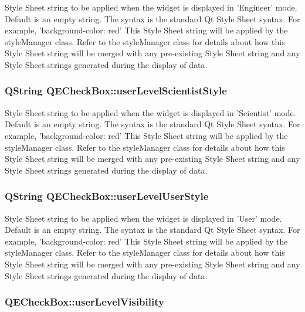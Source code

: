 \label{classQECheckBox_ae4c0cf42959e19b91ae4894a10c22012}
Style Sheet string to be applied when the widget is displayed in 'Engineer' mode. Default is an empty string. The syntax is the standard Qt Style Sheet syntax. For example, 'background-\/color: red' This Style Sheet string will be applied by the styleManager class. Refer to the styleManager class for details about how this Style Sheet string will be merged with any pre-\/existing Style Sheet string and any Style Sheet strings generated during the display of data. \hypertarget{classQECheckBox_ad57869fb4989034ec09ef1a57ab87bb0}{
\subsubsection[{userLevelScientistStyle}]{\setlength{\rightskip}{0pt plus 5cm}QString QECheckBox::userLevelScientistStyle}}
\label{classQECheckBox_ad57869fb4989034ec09ef1a57ab87bb0}
Style Sheet string to be applied when the widget is displayed in 'Scientist' mode. Default is an empty string. The syntax is the standard Qt Style Sheet syntax. For example, 'background-\/color: red' This Style Sheet string will be applied by the styleManager class. Refer to the styleManager class for details about how this Style Sheet string will be merged with any pre-\/existing Style Sheet string and any Style Sheet strings generated during the display of data. \hypertarget{classQECheckBox_a6e46e41202d593976b629f33b43892b5}{
\subsubsection[{userLevelUserStyle}]{\setlength{\rightskip}{0pt plus 5cm}QString QECheckBox::userLevelUserStyle}}
\label{classQECheckBox_a6e46e41202d593976b629f33b43892b5}
Style Sheet string to be applied when the widget is displayed in 'User' mode. Default is an empty string. The syntax is the standard Qt Style Sheet syntax. For example, 'background-\/color: red' This Style Sheet string will be applied by the styleManager class. Refer to the styleManager class for details about how this Style Sheet string will be merged with any pre-\/existing Style Sheet string and any Style Sheet strings generated during the display of data. \hypertarget{classQECheckBox_ae919c2bf8265005e45e2c6de44839e8e}{
\subsubsection[{userLevelVisibility}]{ QECheckBox::userLevelVisibility}}
